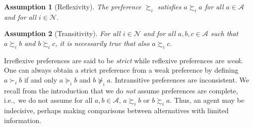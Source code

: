 \documentclass[conference]{ieeeconf}
\renewcommand{\succeq}{\succcurlyeq}
\newcommand{\R}{\mathbb{R}}
\newcommand{\N}{\mathcal{N}}
\newcommand{\A}{\mathcal{A}}
\newcommand{\prefers}{\succsim}
\newtheorem{assumption}{Assumption}
\newtheorem{example}{Example}
\begin{document}





\begin{assumption}[Reflexivity] \label{ass:reflexivity}
    The preference $\prefers_i$ satisfies $a \prefers_i a$ for all $a \in \A$ and for all $i \in \N$.
\end{assumption}
\begin{assumption}[Transitivity]\label{ass:transitivity}
    For all $i \in \N$ and for all $a, b, c \in \A$ such that $a \prefers_i b$ and $b \prefers_i c$, it is necessarily true that also $a \prefers_i c$.
\end{assumption}

Irreflexive preferences are said to be \emph{strict} while reflexive preferences are \emph{weak}. One can always obtain a strict preference from a weak preference by defining $a \succ_i b$ if and only $a \succeq_i b$ and $b \not\succeq_i a$. Intransitive preferences are inconsistent. We recall from the introduction that we do \emph{not} assume preferences are complete, i.e.,~we do not assume for all $a,b \in \A$, $a \prefers_i b$ or $b \prefers_i a$. Thus, an agent may be indecisive, perhaps making comparisons between alternatives with limited information.
\end{document}
